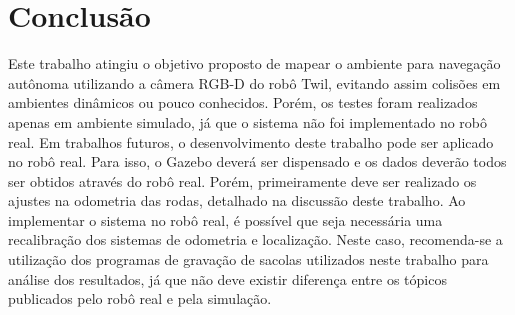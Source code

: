 \documentclass[repeatfields,xlists,xpacks,oneside,yearsonly]{ufrgscca}
\begin{document}
\chapter{Conclusão}
\label{conclusao}

Este trabalho atingiu o objetivo proposto de mapear o ambiente para
navegação autônoma utilizando a câmera RGB-D do robô Twil, evitando
assim colisões em ambientes dinâmicos ou pouco conhecidos. Porém, os
testes foram realizados apenas em ambiente simulado, já que o sistema
não foi implementado no robô real. Em trabalhos futuros, o
desenvolvimento deste trabalho pode ser aplicado no robô real. Para
isso, o Gazebo deverá ser dispensado e os dados deverão todos ser
obtidos através do robô real. Porém, primeiramente deve ser realizado
os ajustes na odometria das rodas, detalhado na discussão deste
trabalho. Ao implementar o sistema no robô real, é possível que seja
necessária uma recalibração dos sistemas de odometria e localização.
Neste caso, recomenda-se a utilização dos programas de gravação de
sacolas utilizados neste trabalho para análise dos resultados, já que
não deve existir diferença entre os tópicos publicados pelo robô real
e pela simulação.

\printbibliography

%
%
%
\end{document}
